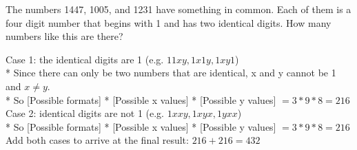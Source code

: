 \question 
The numbers 1447, 1005, and 1231 have something in common. Each of them 
is a four digit number that begins with 1 and has two identical digits. 
How many numbers like this are there?
\begin{solution}[3 mm]
Case 1: the identical digits are 1 (e.g. $11xy, 1x1y, 1xy1$) \\*
Since there can only be two numbers that are identical, x and y cannot 
be 1 and $x \neq y$. \\*
So [Possible formats] * [Possible x values] * [Possible y values] $= 
3 * 9 * 8 = 216$ \\
Case 2: identical digits are not 1 (e.g. $1xxy, 1xyx, 1yxx$) \\* So 
[Possible formats] * [Possible x values] * [Possible y values] 
$= 3 * 9 * 8 = 216$ \\
Add both cases to arrive at the final result: $216 + 216 = 432$
\end{solution}